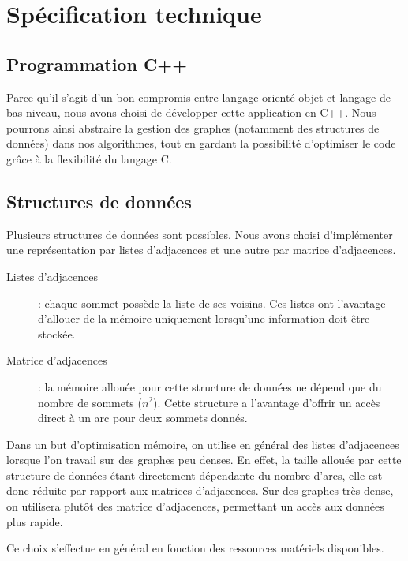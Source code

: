 \section{Spécification technique}

\subsection{Programmation C++}
Parce qu'il s'agit d'un bon compromis entre langage orienté objet et langage de bas niveau, nous avons choisi de développer cette application en C++. Nous pourrons ainsi abstraire la gestion des graphes (notamment des structures de données) dans nos algorithmes, tout en gardant la possibilité d'optimiser le code grâce à la flexibilité du langage C.

\subsection{Structures de données}

Plusieurs structures de données sont possibles. Nous avons choisi d'implémenter une représentation par listes d'adjacences et une autre par matrice d'adjacences.
\begin{description}
\item[Listes d'adjacences] : chaque sommet possède la liste de ses voisins. Ces listes ont l'avantage d'allouer de la mémoire uniquement lorsqu'une information doit être stockée. 
\item[Matrice d'adjacences] : la mémoire allouée pour cette structure de données ne dépend que du nombre de sommets ($n^2$). Cette structure a l'avantage d'offrir un accès direct à un arc pour deux sommets donnés.
\end{description}

Dans un but d'optimisation mémoire, on utilise en général des listes d'adjacences lorsque l'on travail sur des graphes peu denses. En effet, la taille allouée par cette structure de données étant directement dépendante du nombre d'arcs, elle est donc réduite par rapport aux matrices d'adjacences. Sur des graphes très dense, on utilisera plutôt des matrice d'adjacences, permettant un accès aux données plus rapide. 

Ce choix s'effectue en général en fonction des ressources matériels disponibles.

